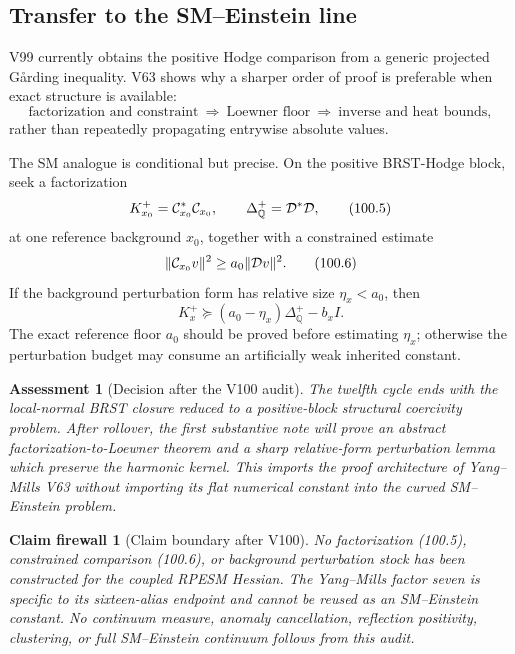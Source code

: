 \documentclass[11pt]{article}
\newtheorem{firewall}[theorem]{Claim firewall}
\newtheorem{assessment}[theorem]{Assessment}
\theoremstyle{remark}
\begin{document}
\subsection{Transfer to the SM--Einstein line}

V99 currently obtains the positive Hodge comparison from a generic
projected G{\aa}rding inequality.  V63 shows why a sharper order of
proof is preferable when exact structure is available:
\[
 \text{factorization and constraint}
 \ \Longrightarrow\ \text{Loewner floor}
 \ \Longrightarrow\ \text{inverse and heat bounds},             \tag{100.4}
\]
rather than repeatedly propagating entrywise absolute values.

The SM analogue is conditional but precise.  On the positive
BRST-Hodge block, seek a factorization
\[
 K_{x_0}^+={\cal C}_{x_0}^*{\cal C}_{x_0},\qquad
 \Delta_{\mathbb Q}^+={\cal D}^*{\cal D},                        \tag{100.5}
\]
at one reference background \(x_0\), together with a constrained
estimate
\[
 \|{\cal C}_{x_0}v\|^2\geq a_0\|{\cal D}v\|^2.                  \tag{100.6}
\]
If the background perturbation form has relative size
\(\eta_x<a_0\), then
\[
 K_x^+\succeq(a_0-\eta_x)\Delta_{\mathbb Q}^+
             -b_xI.                                            \tag{100.7}
\]
The exact reference floor \(a_0\) should be proved before estimating
\(\eta_x\); otherwise the perturbation budget may consume an
artificially weak inherited constant.

\begin{assessment}[Decision after the V100 audit]
\label{ass:v12v100-decision}
The twelfth cycle ends with the local-normal BRST closure reduced to
a positive-block structural coercivity problem.  After rollover, the
first substantive note will prove an abstract
factorization-to-Loewner theorem and a sharp relative-form
perturbation lemma which preserve the harmonic kernel.  This imports
the proof architecture of Yang--Mills V63 without importing its
flat numerical constant into the curved SM--Einstein problem.
\end{assessment}

\begin{firewall}[Claim boundary after V100]
\label{fire:v12v100-claim}
No factorization (100.5), constrained comparison (100.6), or
background perturbation stock has been constructed for the coupled
RPESM Hessian.  The Yang--Mills factor seven is specific to its
sixteen-alias endpoint and cannot be reused as an SM--Einstein
constant.  No continuum measure, anomaly cancellation, reflection
positivity, clustering, or full SM--Einstein continuum follows from
this audit.
\end{firewall}
\end{document}
